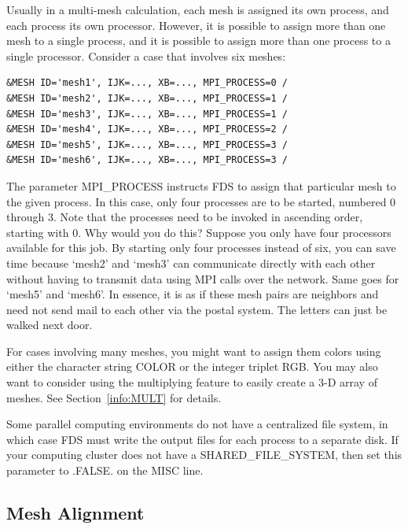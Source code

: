 \documentclass[11pt]{book}
\begin{document}
Usually in a multi-mesh calculation, each mesh is assigned its own process, and each process its own processor. However, it is possible to assign more than one
mesh to a single process, and it is possible to assign more than one process to a single processor. Consider a case that involves six meshes:
\begin{lstlisting}
&MESH ID='mesh1', IJK=..., XB=..., MPI_PROCESS=0 /
&MESH ID='mesh2', IJK=..., XB=..., MPI_PROCESS=1 /
&MESH ID='mesh3', IJK=..., XB=..., MPI_PROCESS=1 /
&MESH ID='mesh4', IJK=..., XB=..., MPI_PROCESS=2 /
&MESH ID='mesh5', IJK=..., XB=..., MPI_PROCESS=3 /
&MESH ID='mesh6', IJK=..., XB=..., MPI_PROCESS=3 /
\end{lstlisting}
The parameter {\ct MPI\_PROCESS} instructs FDS to assign that particular mesh to the given process. In this case, only four processes are to be started, numbered
0 through 3. Note that the processes need to be invoked in ascending order, starting with 0. Why would you do this?
Suppose you only have four processors available for this
job. By starting only four processes instead of six, you can save time because `mesh2' and `mesh3'
can communicate directly with each other without having to transmit data
using MPI calls over the network. Same goes for `mesh5' and `mesh6'.
In essence, it is as if these mesh pairs are neighbors and need not send mail to each other via the postal system. The letters can just be
walked next door.

For cases involving many meshes, you might want to assign them colors using either the character string {\ct COLOR} or the integer triplet {\ct RGB}. You may also
want to consider using the multiplying feature to easily create a 3-D array of meshes. See Section~\ref{info:MULT} for details.

Some parallel computing environments do not have a centralized file system, in which case FDS must write the output files for each process to a separate disk. If
your computing cluster does not have a {\ct SHARED\_FILE\_SYSTEM}, then set this parameter to {\ct .FALSE.} on the {\ct MISC} line.


\subsection{Mesh Alignment}
\end{document}
